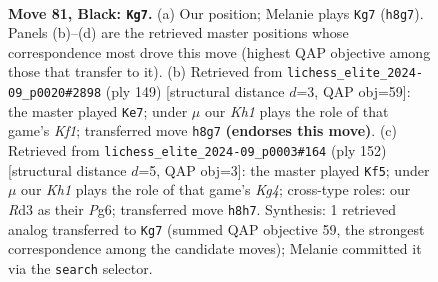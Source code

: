 \documentclass[11pt]{article}
\begin{document}
\clearpage

\begin{figure}[p]\centering
\begin{subfigure}{0.46\textwidth}\centering
\resizebox{\linewidth}{!}{%
\newchessgame
\chessboard[
  setfen={1R5k/8/8/6K1/r6P/3r4/8/8 b - - 4 81},
  showmover=false,
  pgfstyle=straightmove, color=movearrow, markmove={h8-g7}
]}
\caption{}
\end{subfigure}\hfill
\begin{subfigure}{0.46\textwidth}\centering
\resizebox{\linewidth}{!}{%
\newchessgame
\chessboard[
  setfen={R4k2/8/6K1/5P2/8/8/8/5r2 b - - 2 75},
  showmover=false,
  pgfstyle=straightmove, color=movearrow, markmove={f8-e7}
]}
\caption{}
\end{subfigure}
\\[4pt]
\begin{subfigure}{0.46\textwidth}\centering
\resizebox{\linewidth}{!}{%
\newchessgame
\chessboard[
  setfen={8/8/1r4P1/4R3/6K1/8/4p3/5k2 w - - 1 77},
  showmover=false,
  pgfstyle=straightmove, color=movearrow, markmove={g4-f5}
]}
\caption{}
\end{subfigure}\hfill

\caption{\textbf{Move 81, Black: \texttt{Kg7}.} (a) Our position; Melanie plays \texttt{Kg7} (\texttt{h8g7}). Panels (b)--(d) are the retrieved master positions whose correspondence most drove this move (highest QAP objective among those that transfer to it). (b) Retrieved from \texttt{lichess\_elite\_2024-09\_p0020\#2898} (ply 149) [structural distance $d$=3, QAP obj=59]: the master played \texttt{Ke7}; under $\mu$ our \emph{Kh1} plays the role of that game's \emph{Kf1}; transferred move \texttt{h8g7} \textbf{(endorses this move)}. (c) Retrieved from \texttt{lichess\_elite\_2024-09\_p0003\#164} (ply 152) [structural distance $d$=5, QAP obj=3]: the master played \texttt{Kf5}; under $\mu$ our \emph{Kh1} plays the role of that game's \emph{Kg4}; cross-type roles: our \emph{R}d3 as their \emph{P}g6; transferred move \texttt{h8h7}. Synthesis: 1 retrieved analog transferred to \texttt{Kg7} (summed QAP objective 59, the strongest correspondence among the candidate moves); Melanie committed it via the \texttt{search} selector.}
\label{fig:thought-m161}
\end{figure}

\clearpage
\end{document}
